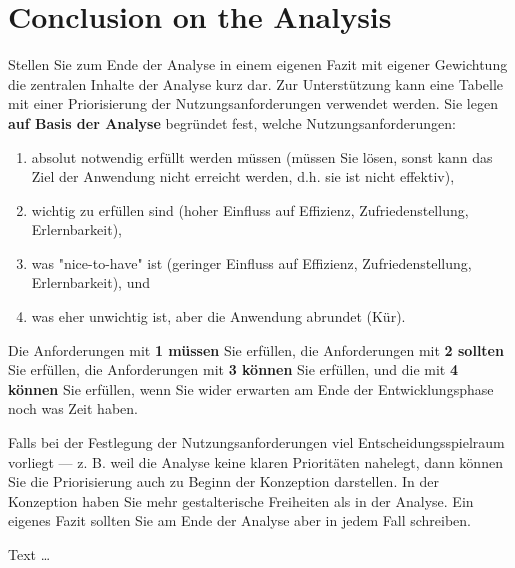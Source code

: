 \documentclass[11pt,a4paper,english]{scrreprt}
\newenvironment{comment}
  {\par\medskip
   \begingroup\color{olive}%
   }
 {\endgroup
  \medskip}
\begin{document}
\section{Conclusion on the Analysis}
\begin{comment}
Stellen Sie zum Ende der Analyse in einem eigenen Fazit mit eigener Gewichtung die zentralen Inhalte der Analyse kurz dar. Zur Unterstützung kann eine Tabelle mit einer Priorisierung der Nutzungsanforderungen verwendet werden. Sie legen \textbf{auf Basis der Analyse} begründet fest, welche Nutzungsanforderungen:

\begin{enumerate}
    \item absolut notwendig erfüllt werden müssen (müssen Sie lösen, sonst kann das Ziel der Anwendung nicht erreicht werden, d.h. sie ist nicht effektiv),
    \item wichtig zu erfüllen sind (hoher Einfluss auf Effizienz, Zufriedenstellung, Erlernbarkeit),
    \item was "nice-to-have" ist (geringer Einfluss auf Effizienz, Zufriedenstellung, Erlernbarkeit), und
    \item was eher unwichtig ist, aber die Anwendung abrundet (Kür).
\end{enumerate}

Die Anforderungen mit \textbf{1 müssen} Sie erfüllen, die Anforderungen mit \textbf{2 sollten} Sie erfüllen, die Anforderungen mit \textbf{3 können} Sie erfüllen, und die mit \textbf{4 können} Sie erfüllen, wenn Sie wider erwarten am Ende der Entwicklungsphase noch was Zeit haben.

Falls bei der Festlegung der Nutzungsanforderungen viel Entscheidungsspielraum vorliegt — z. B. weil die Analyse keine klaren Prioritäten nahelegt, dann können Sie die Priorisierung auch zu Beginn der Konzeption darstellen. In der Konzeption haben Sie mehr gestalterische Freiheiten als in der Analyse. Ein eigenes Fazit sollten Sie am Ende der Analyse aber in jedem Fall schreiben.
\end{comment}

Text \dots

\newpage
\end{document}

